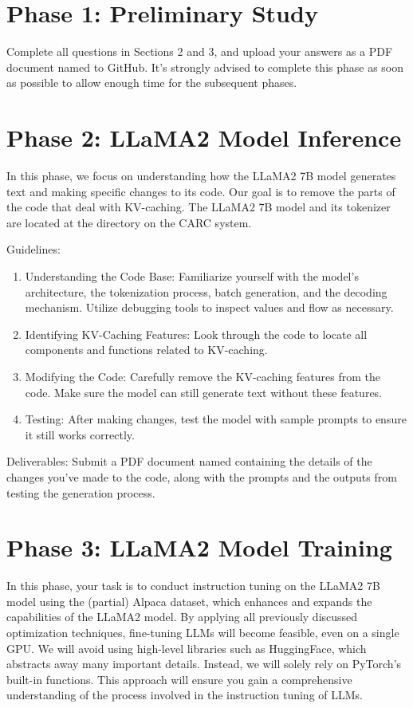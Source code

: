 \section{Phase 1: Preliminary Study}

Complete all questions in Sections 2 and 3, and upload your answers as a PDF document named  to GitHub. It's strongly advised to complete this phase as soon as possible to allow enough time for the subsequent phases.



\section{Phase 2: LLaMA2 Model Inference}
In this phase, we focus on understanding how the LLaMA2 7B model generates text and making specific changes to its code. Our goal is to remove the parts of the code that deal with KV-caching. The LLaMA2 7B model and its tokenizer are located at the directory  on the CARC system.

Guidelines: 
\begin{enumerate}
\item Understanding the Code Base: Familiarize yourself with the model's architecture, the tokenization process, batch generation, and the decoding mechanism. Utilize debugging tools to inspect values and flow as necessary.
\item Identifying KV-Caching Features: Look through the code to locate all components and functions related to KV-caching.
\item Modifying the Code: Carefully remove the KV-caching features from the code. Make sure the model can still generate text without these features.
\item Testing: After making changes, test the model with sample prompts to ensure it still works correctly.
\end{enumerate}

Deliverables: Submit a PDF document named  containing the details of the changes you've made to the code, along with the prompts and the outputs from testing the generation process.




\section{Phase 3: LLaMA2 Model Training}
In this phase, your task is to conduct instruction tuning on the LLaMA2 7B model using the (partial) Alpaca dataset, which enhances and expands the capabilities of the LLaMA2 model. By applying all previously discussed optimization techniques, fine-tuning LLMs will become feasible, even on a single GPU. We will avoid using high-level libraries such as HuggingFace, which abstracts away many important details. Instead, we will solely rely on PyTorch's built-in functions. This approach will ensure you gain a comprehensive understanding of the process involved in the instruction tuning of LLMs.

